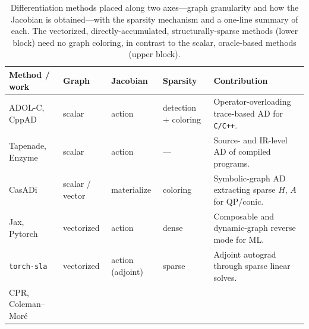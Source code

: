 %

\begin{table}[ht]
\centering
\footnotesize
\setlength{\tabcolsep}{2.5pt}
\caption{Differentiation methods placed along two axes---graph granularity and how the Jacobian is
obtained---with the sparsity mechanism and a one-line summary of each. The vectorized,
directly-accumulated, structurally-sparse methods (lower block) need no graph coloring, in contrast
to the scalar, oracle-based methods (upper block).}
\label{tab:ad-landscape-full}
\begin{tabular}{@{}>{\raggedright\arraybackslash}p{2.9cm} >{\raggedright\arraybackslash}p{1.5cm}
  >{\raggedright\arraybackslash}p{2.0cm} >{\raggedright\arraybackslash}p{2.0cm}
  >{\raggedright\arraybackslash}p{5.1cm}@{}}
\toprule
\textbf{Method / work} & \textbf{Graph} & \textbf{Jacobian} & \textbf{Sparsity} &
\textbf{Contribution} \\
\midrule
ADOL-C, CppAD \cite{griewank1996adolc, bell2012cppad}
  & scalar & action & detection $+$ coloring
  & Operator-overloading trace-based AD for \texttt{C/C++}. \\
Tapenade, Enzyme \cite{hascoet2013tapenade, moses2020enzyme}
  & scalar & action & ---
  & Source- and IR-level AD of compiled programs. \\
CasADi \cite{andersson2019}
  & scalar / vector & materialize & coloring
  & Symbolic-graph AD extracting sparse $H$, $A$ for QP/conic. \\
Jax, Pytorch \cite{jax2018github, pytorch2019}
  & vectorized & action & dense
  & Composable and dynamic-graph reverse mode for ML. \\
\texttt{torch-sla} \cite{chi2026torchsla}
  & vectorized & action (adjoint) & sparse
  & Adjoint autograd through sparse linear solves. \\
\addlinespace
CPR, Coleman--Moré \cite{curtis1974estimation, coleman1983estimation}

\end{tabular}
\end{table}
